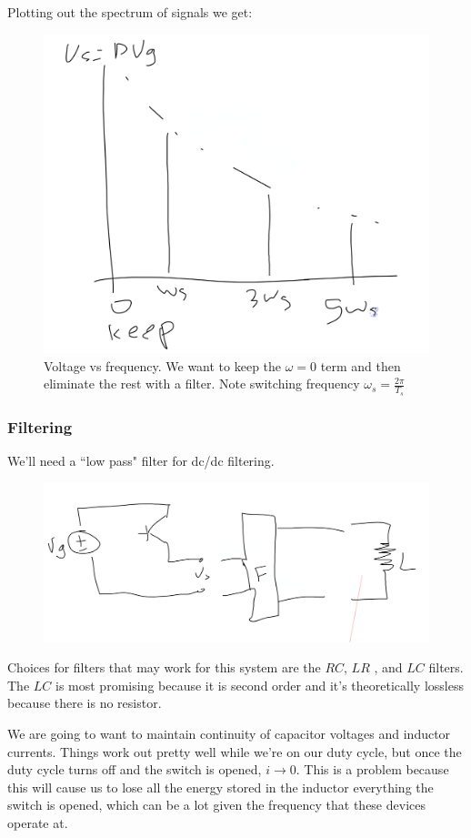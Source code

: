 \documentclass[../notes.tex]{subfiles}
\begin{document}
Plotting out the spectrum of signals we get:

\begin{figure}[H]
	\centering
	\includegraphics[width=0.8\linewidth]{img/image_2022-09-23-15-29-38.png}
	\caption{Voltage vs frequency. We want to keep the $ \omega=0 $ term and then eliminate the rest with a filter. Note switching frequency $ \omega_s = \frac{2\pi}{T_s} $    }
\end{figure}

\subsubsection{Filtering}

We'll need a ``low pass" filter for dc/dc filtering.

\begin{figure}[H]
	\centering
	\includegraphics[width=0.8\linewidth]{img/image_2022-09-23-15-33-06.png}
\end{figure}

Choices for filters that may work for this system are the $ RC $, $ LR $ , and $ LC $ filters.
The $ LC $ is most promising because it is second order and it's theoretically lossless because there is no resistor.


We are going to want to maintain continuity of capacitor voltages and inductor currents.
Things work out pretty well while we're on our duty cycle, but once the duty cycle turns off and the switch is opened, $ i \to 0$. 
This is a problem because this will cause us to lose all the energy stored in the inductor everything the switch is opened, which can be a lot given the frequency that these devices operate at.
\end{document}
